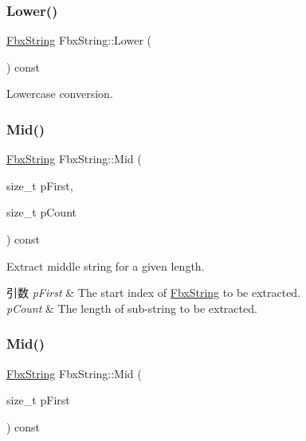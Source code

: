 \subsubsection{\texorpdfstring{Lower()}{Lower()}}
{\footnotesize\ttfamily \hyperlink{class_fbx_string}{Fbx\+String} Fbx\+String\+::\+Lower (\begin{DoxyParamCaption}{ }\end{DoxyParamCaption}) const}



Lowercase conversion. 

\mbox{\label{class_fbx_string_a308c70f64a1f9504e550438af97a3eeb}} 
\subsubsection{\texorpdfstring{Mid()}{Mid()}\hspace{0.1cm}{\footnotesize\ttfamily [1/2]}}
{\footnotesize\ttfamily \hyperlink{class_fbx_string}{Fbx\+String} Fbx\+String\+::\+Mid (\begin{DoxyParamCaption}\item[{size\+\_\+t}]{p\+First,  }\item[{size\+\_\+t}]{p\+Count }\end{DoxyParamCaption}) const}

Extract middle string for a given length. 
\begin{DoxyParams}{引数}
{\em p\+First} & The start index of \hyperlink{class_fbx_string}{Fbx\+String} to be extracted. \\
\hline
{\em p\+Count} & The length of sub-\/string to be extracted. \\
\hline
\end{DoxyParams}
\mbox{\label{class_fbx_string_abec59547bba055c6f339e77be28feb0a}} 
\subsubsection{\texorpdfstring{Mid()}{Mid()}\hspace{0.1cm}{\footnotesize\ttfamily [2/2]}}
{\footnotesize\ttfamily \hyperlink{class_fbx_string}{Fbx\+String} Fbx\+String\+::\+Mid (\begin{DoxyParamCaption}\item[{size\+\_\+t}]{p\+First }\end{DoxyParamCaption}) const}

